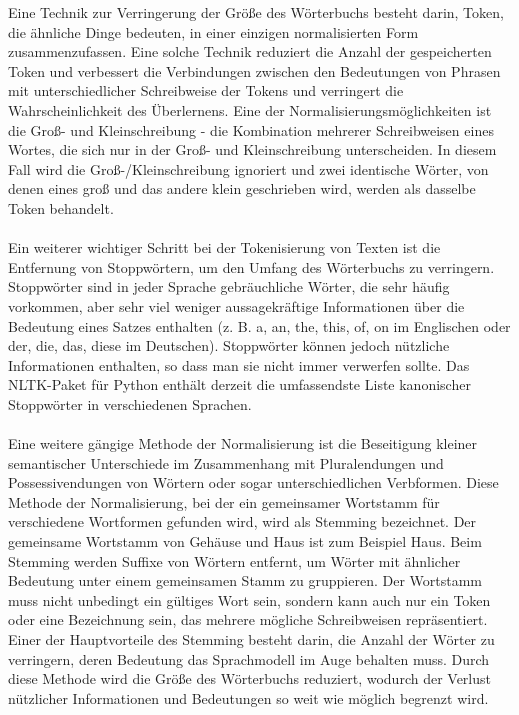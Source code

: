 Eine Technik zur Verringerung der Größe des Wörterbuchs besteht darin, Token, die ähnliche Dinge bedeuten, in einer einzigen normalisierten Form zusammenzufassen. 
Eine solche Technik reduziert die Anzahl der gespeicherten Token und verbessert die Verbindungen zwischen den Bedeutungen von Phrasen mit unterschiedlicher \glqq{}Schreibweise\grqq{} der Tokens und verringert die Wahrscheinlichkeit des Überlernens. 
Eine der Normalisierungsmöglichkeiten ist die Groß- und Kleinschreibung - die Kombination mehrerer Schreibweisen eines Wortes, die sich nur in der Groß- und Kleinschreibung unterscheiden. 
In diesem Fall wird die Groß-/Kleinschreibung ignoriert und zwei identische Wörter, von denen eines groß und das andere klein geschrieben wird, werden als dasselbe Token behandelt.\\\\
Ein weiterer wichtiger Schritt bei der Tokenisierung von Texten ist die Entfernung von Stoppwörtern, um den Umfang des Wörterbuchs zu verringern. 
Stoppwörter sind in jeder Sprache gebräuchliche Wörter, die sehr häufig vorkommen, aber sehr viel weniger aussagekräftige Informationen über die Bedeutung eines Satzes enthalten (z. B. a, an, the, this, of, on im Englischen oder der, die, das, diese im Deutschen). 
Stoppwörter können jedoch nützliche Informationen enthalten, so dass man sie nicht immer verwerfen sollte. 
Das \ac{NLTK}-Paket für Python enthält derzeit die umfassendste Liste kanonischer Stoppwörter in verschiedenen Sprachen. \cite{mccarthy_applied_2011}\\\\
Eine weitere gängige Methode der Normalisierung ist die Beseitigung kleiner semantischer Unterschiede im Zusammenhang mit Pluralendungen und Possessivendungen von Wörtern oder sogar unterschiedlichen Verbformen. 
Diese Methode der Normalisierung, bei der ein gemeinsamer Wortstamm für verschiedene Wortformen gefunden wird, wird als Stemming bezeichnet. 
Der gemeinsame Wortstamm von \glqq{}Gehäuse\grqq{} und \glqq{}Haus\grqq{} ist zum Beispiel \glqq{}Haus\grqq{}.
 Beim Stemming werden Suffixe von Wörtern entfernt, um Wörter mit ähnlicher Bedeutung unter einem gemeinsamen Stamm zu gruppieren. 
 Der Wortstamm muss nicht unbedingt ein gültiges Wort sein, sondern kann auch nur ein Token oder eine Bezeichnung sein, das mehrere mögliche Schreibweisen repräsentiert. 
 Einer der Hauptvorteile des Stemming besteht darin, die Anzahl der Wörter zu verringern, deren Bedeutung das Sprachmodell im Auge behalten muss. 
 Durch diese Methode wird die Größe des Wörterbuchs reduziert, wodurch der Verlust nützlicher Informationen und Bedeutungen so weit wie möglich begrenzt wird. 
